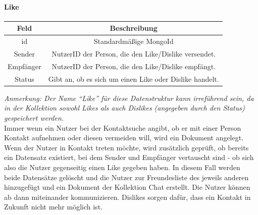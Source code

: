 \paragraph{Like\\}
\begin{center}
    \begin{tabular}{ |c|c| }
        \hline
        Feld & Beschreibung  \\
        \hline
        id & Standardmäßige MongoId \\
        Sender & NutzerID der Person, die den Like/Dislike versendet. \\
        Empfänger &  NutzerID der Person, die den Like/Dislike empfängt. \\
        Status & Gibt an, ob es sich um einen Like oder Dislike handelt. \\
        \hline
    \end{tabular}
\end{center}

\textit{Anmerkung: Der Name \enquote{Like} für diese Datenstruktur kann irreführend sein, da in der Kollektion sowohl Likes als auch Dislikes (angegeben durch den Status) gespeichert werden.\\}
Immer wenn ein Nutzer bei der Kontaktsuche angibt, ob er mit einer Person Kontakt aufnehmen oder diesen vermeiden will, wird ein Dokument angelegt. 
Wenn der Nutzer in Kontakt treten möchte, wird zusätzlich geprüft, ob bereits ein Datensatz existiert, bei dem Sender und Empfänger vertauscht sind - ob sich also die Nutzer gegenseitig einen Like gegeben haben. 
In diesem Fall werden beide Datensätze gelöscht und die Nutzer zur Freundesliste des jeweils anderen hinzugefügt und ein Dokument der Kollektion Chat erstellt. 
Die Nutzer können ab dann miteinander kommunizieren. 
Dislikes sorgen dafür, dass ein Kontakt in Zukunft nicht mehr möglich ist.

